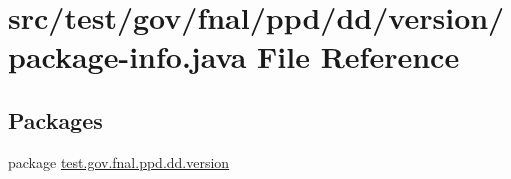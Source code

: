 \hypertarget{test_2gov_2fnal_2ppd_2dd_2version_2package-info_8java}{\section{src/test/gov/fnal/ppd/dd/version/package-\/info.java File Reference}
\label{test_2gov_2fnal_2ppd_2dd_2version_2package-info_8java}
}
\subsection*{Packages}
\begin{DoxyCompactItemize}
\item 
package \hyperlink{namespacetest_1_1gov_1_1fnal_1_1ppd_1_1dd_1_1version}{test.\-gov.\-fnal.\-ppd.\-dd.\-version}
\end{DoxyCompactItemize}
